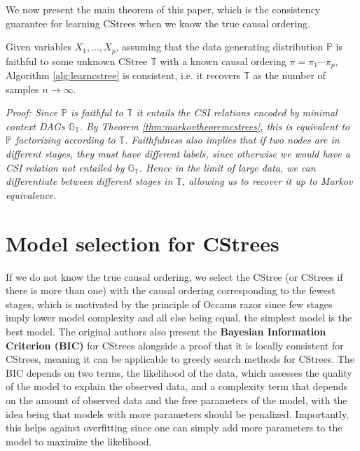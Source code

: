 \documentclass{tufte-book}
\begin{document}
We now present the main theorem of this paper, which is the consistency guarantee for learning CStrees when we know the true causal ordering.


\begin{theorem}\label{thm:cstreepccorrectness}
Given variables $X_1,...,X_p$, assuming that the data generating distribution $\mathbb{P}$ is faithful to some unknown CStree $\mathbb{T}$ with a known causal ordering $\pi = \pi_1 \cdots \pi_p$, Algorithm \ref{alg:learncstree} is consistent, i.e. it recovers $\mathbb{T}$ as the number of samples $n \rightarrow \infty$.
\end{theorem}


\textit{Proof:
Since $\mathbb{P}$ is faithful to $\mathbb{T}$ it entails the CSI relations encoded by minimal context DAGs $\mathbb{G}_{\mathbb{T}}$. By Theorem \ref{thm:markovtheoremcstrees}, this is equivalent to $\mathbb{P}$ factorizing according to $\mathbb{T}$. Faithfulness also implies that if two nodes are in different stages, they must have different labels, since otherwise we would have a CSI relation not entailed by $\mathbb{G}_{\mathbb{T}}$. Hence in the limit of large data, we can differentiate between different stages in $\mathbb{T}$, allowing us to recover it up to Markov equivalence.
}

\section{Model selection for CStrees}
\label{sec:orga4c81d4}
If we do not know the true causal ordering, we select the CStree (or CStrees if there is more than one) with the causal ordering corresponding to the fewest stages, which is motivated by the principle of Occams razor \cite{pearl-2009-causal} since few stages imply lower model complexity and all else being equal, the simplest model is the best model. The original authors also present the \textbf{Bayesian Information Criterion (BIC)} for CStrees alongside a proof that it is locally consistent for CStrees, meaning it can be applicable to greedy search methods for CStrees. The BIC depends on two terms, the likelihood of the data, which assesses the quality of the model to explain the observed data, and a complexity term that depends on the amount of observed data and the free parameters of the model, with the idea being that models with more parameters should be penalized. Importantly, this helps against overfitting since one can simply add more parameters to the model to maximize the likelihood.
\end{document}
